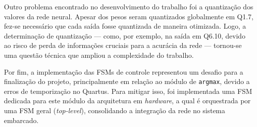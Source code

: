 Outro problema encontrado no desenvolvimento do trabalho foi a quantização dos valores da rede neural. Apesar dos pesos seram quantizados globalmente em Q1.7, fez-se necessário que cada saída fosse quantizada de maneira otimizada. Logo, a determinação de quantização — como, por exemplo, na saída em Q6.10, devido ao risco de perda de informações cruciais para a acurácia da rede — tornou-se uma questão técnica que ampliou a complexidade do trabalho.

Por fim, a implementação das FSMs de controle representou um desafio para a finalização do projeto, principalmente em relação ao módulo de \texttt{argmax}, devido a erros de temporização no Quartus. Para mitigar isso, foi implementada uma FSM dedicada para este módulo da arquitetura em \textit{hardware}, a qual é orquestrada por uma FSM geral (\textit{top-level}), consolidando a integração da rede no sistema embarcado.